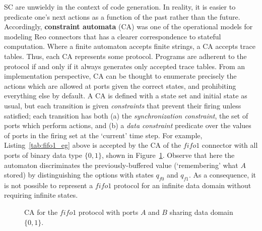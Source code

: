 SC are unwieldy in the context of code generation. In reality, it is easier to predicate one's next actions as a function of the past rather than the future. Accordingly, \textbf{constraint automata} (CA) was one of the operational models for modeling Reo connectors that has a clearer correspondence to stateful computation. Where a finite automaton accepts finite strings, a CA accepts trace tables. Thus, each CA represents some protocol. Programs are adherent to the protocol if and only if it always generates only accepted trace tables. From an implementation perspective, CA can be thought to enumerate precisely the actions which are allowed at ports given the correct states, and prohibiting everything else by default. A CA is defined with a state set and initial state as usual, but each transition is given \textit{constraints} that prevent their firing unless satisfied; each transition has both (a) the \textit{synchronization constraint}, the set of ports which perform actions, and (b) a \textit{data constraint} predicate over the values of ports in the firing set at the `current' time step. For example, Listing~\ref{tab:fifo1_eg} above is accepted by the CA of the $fifo1$ connector with all ports of binary data type $\{0,1\}$, shown in Figure~\ref{fig:fifo1_ca}. Observe that here the automaton discriminates the previously-buffered value (`remembering' what $A$ stored) by distinguishing the options with states $q_{f0}$ and $q_{f1}$. As a consequence, it is not possible to represent a $fifo1$ protocol for an infinite data domain without requiring infinite states.
\begin{figure}[ht]
	\centering
	\caption[CA for fifo1 connector.]{CA for the $fifo1$ protocol with ports $A$ and $B$ sharing data domain $\{0,1\}$.}
	\label{fig:fifo1_ca}
\end{figure}

